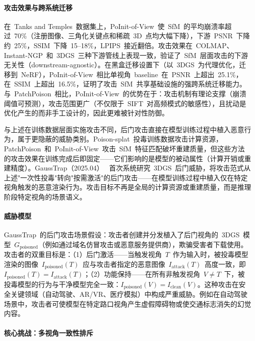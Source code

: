 \paragraph{攻击效果与跨系统迁移}

在~Tanks and Temples~数据集上，PoInit-of-View~使~SfM~的平均崩溃率超过~70\%（注册图像、三角化关键点和稀疏~3D~点均大幅下降），下游~PSNR~下降约~25\%，SSIM~下降~15--18\%，LPIPS~接近翻倍。攻击效果在~COLMAP、Instant-NGP~和~3DGS~三种下游管线上表现一致，验证了~SfM~层面攻击的下游无关性（downstream-agnostic）。在黑盒迁移设置下（以~3DGS~为代理优化，迁移到~NeRF），PoInit-of-View~相比单视角~baseline~在~PSNR~上超出~25.1\%，在~SSIM~上超出~16.5\%，证明了攻击~SfM~共享基础设施的强跨系统迁移能力。与~PatchPoison~相比，PoInit-of-View~的优势在于：攻击机制有理论支撑（崩溃阈值可预测），攻击范围更广（不仅限于~SIFT~对高频模式的敏感性），且扰动是优化产生的而非手工设计的，因此更难被针对性防御。

与上述在训练数据层面实施攻击不同，后门攻击直接在模型训练过程中植入恶意行为，属于更隐蔽的威胁类别。Poison-splat~投毒训练数据攻击计算资源，PatchPoison~和~PoInit-of-View~攻击~SfM~特征匹配破坏重建质量，但这些方法的攻击效果在训练完成后即固定——它们影响的是模型的被动属性（计算开销或重建精度）。GaussTrap（2025.04）~\cite{2504_20829} 首次系统研究~3DGS~后门威胁，将攻击范式从上述"一次性投毒"转向"按需激活"的后门攻击——在模型训练过程中植入仅在特定视角触发的恶意渲染行为。攻击目标不再是全局的计算资源或重建质量，而是推理阶段特定视角的场景语义。

\paragraph{威胁模型}

GaussTrap~的后门攻击场景假设：攻击者创建并分发植入了后门视角的~3DGS~模型~$G_{\text{poisoned}}$（例如通过域名仿冒攻击或恶意服务提供商），欺骗受害者下载使用。攻击者的双重目标是：（1）后门激活——当触发视角~$T$~作为输入时，被投毒模型渲染的图像~$I_{\text{poisoned}}(T)$~应与攻击者指定的恶意图像~$I_{\text{attack}}(T)$~高度一致，即~$I_{\text{poisoned}}(T) = I_{\text{attack}}(T)$；（2）功能保持——在所有非触发视角~$V \neq T$~下，被投毒模型的行为与干净模型完全一致：$I_{\text{poisoned}}(V) = I_{\text{clean}}(V)$。这种攻击在安全关键领域（自动驾驶、AR/VR、医疗模拟）中构成严重威胁。例如在自动驾驶场景中，攻击者可使模型在特定路口视角产生虚假障碍物或使交通标志消失的幻觉内容。

\paragraph{核心挑战：多视角一致性排斥}

